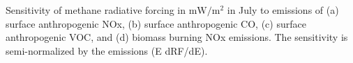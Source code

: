 Sensitivity of methane radiative forcing in $\mathrm{mW/m^2}$ in July to emissions of (a) surface anthropogenic NOx, (b) surface anthropogenic CO, (c) surface anthropogenic VOC, and (d) biomass burning NOx emissions. The sensitivity is semi-normalized by the emissions (E dRF/dE). \label{fig:rfsens}